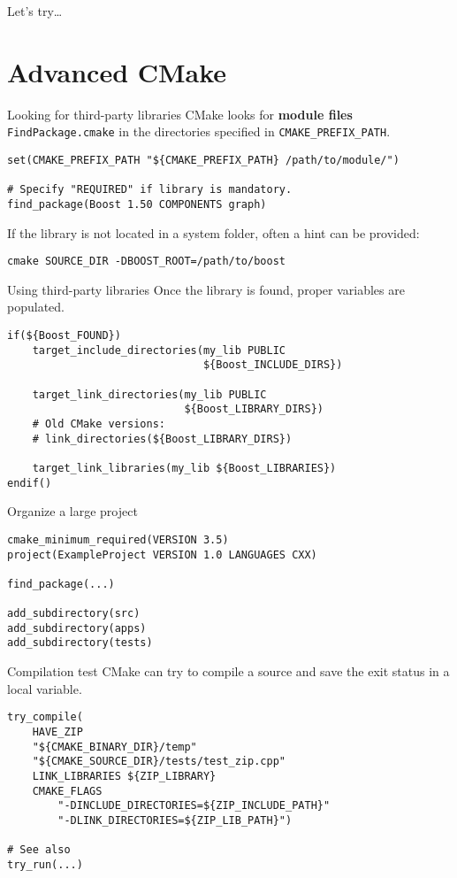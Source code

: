 \documentclass[aspectratio=169,11pt]{beamer}
\begin{document}
\begin{frame}[focus]{}
Let's try\dots
\end{frame}

\section{Advanced CMake}
\begin{frame}[fragile]{Looking for third-party libraries}
CMake looks for \textbf{module files} \texttt{FindPackage.cmake} in the directories specified in \texttt{CMAKE\_PREFIX\_PATH}.
\vfill
\begin{verbatim}
set(CMAKE_PREFIX_PATH "${CMAKE_PREFIX_PATH} /path/to/module/")

# Specify "REQUIRED" if library is mandatory.
find_package(Boost 1.50 COMPONENTS graph)
\end{verbatim}
\vfill
If the library is not located in a system folder, often a hint can be provided:
\begin{verbatim}
cmake SOURCE_DIR -DBOOST_ROOT=/path/to/boost
\end{verbatim}
\end{frame}

\begin{frame}[fragile]{Using third-party libraries}
Once the library is found, proper variables are populated.
\begin{verbatim}
if(${Boost_FOUND})
    target_include_directories(my_lib PUBLIC
                               ${Boost_INCLUDE_DIRS})
    
    target_link_directories(my_lib PUBLIC
                            ${Boost_LIBRARY_DIRS})
    # Old CMake versions:
    # link_directories(${Boost_LIBRARY_DIRS})
    
    target_link_libraries(my_lib ${Boost_LIBRARIES})
endif()
\end{verbatim}
\end{frame}

\begin{frame}[fragile]{Organize a large project}
\begin{verbatim}
cmake_minimum_required(VERSION 3.5)
project(ExampleProject VERSION 1.0 LANGUAGES CXX)

find_package(...)

add_subdirectory(src)
add_subdirectory(apps)
add_subdirectory(tests)
\end{verbatim}
\end{frame}

\begin{frame}[fragile]{Compilation test}
CMake can try to compile a source and save the exit status in a local variable.
\begin{verbatim}
try_compile(
    HAVE_ZIP
    "${CMAKE_BINARY_DIR}/temp"
    "${CMAKE_SOURCE_DIR}/tests/test_zip.cpp"
    LINK_LIBRARIES ${ZIP_LIBRARY}
    CMAKE_FLAGS
        "-DINCLUDE_DIRECTORIES=${ZIP_INCLUDE_PATH}"
        "-DLINK_DIRECTORIES=${ZIP_LIB_PATH}")

# See also
try_run(...)
\end{verbatim}
\end{frame}
\end{document}
